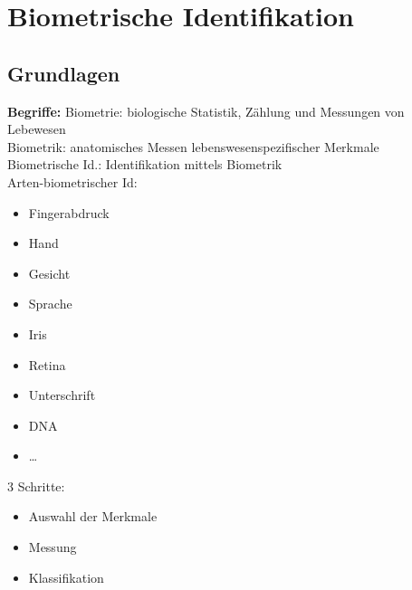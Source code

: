 \documentclass[a4paper,12pt]{scrreprt}
\newcommand{\Nb}[1]{\textbf{#1}}
\begin{document}
\chapter{Biometrische Identifikation}
\section{Grundlagen}
\Nb{Begriffe:} 
Biometrie: biologische Statistik, Zählung und Messungen von
Lebewesen\\
Biometrik: anatomisches Messen lebenswesenspezifischer Merkmale\\
Biometrische Id.: Identifikation mittels Biometrik\\
Arten-biometrischer Id:
\begin{itemize}
	\item Fingerabdruck
	\item Hand
	\item Gesicht
	\item Sprache
	\item Iris
	\item Retina
	\item Unterschrift
	\item DNA
	\item \dots
\end{itemize}

3 Schritte: \begin{itemize}
	\item Auswahl der Merkmale
	\item Messung
	\item Klassifikation
\end{itemize}
\end{document}
